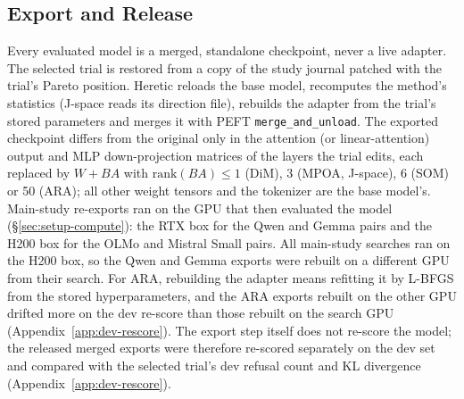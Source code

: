 \subsection{Export and Release}
\label{sec:setup-export}

Every evaluated model is a merged, standalone checkpoint, never a live adapter.
The selected trial is restored from a copy of the study journal patched with
the trial's Pareto position. Heretic reloads the base model,
recomputes the method's statistics (J-space reads its direction file), rebuilds
the adapter from the trial's stored parameters and merges it with PEFT
\texttt{merge\_and\_unload}. The exported checkpoint differs from the original
only in the attention (or linear-attention) output and MLP down-projection
matrices of the layers the trial edits, each replaced by $W+BA$ with
$\mathrm{rank}(BA)\le1$ (DiM), 3 (MPOA, J-space), 6 (SOM) or 50 (ARA); all
other weight tensors and the tokenizer are the base model's. Main-study
re-exports ran on the GPU that then evaluated the model
(\S\ref{sec:setup-compute}): the RTX box for the Qwen and Gemma pairs and the
H200 box for the OLMo and Mistral Small pairs. All main-study searches ran on
the H200 box, so the Qwen and Gemma exports were rebuilt on a different GPU
from their search. For ARA, rebuilding the adapter means refitting it by
L-BFGS from the stored hyperparameters, and the ARA exports rebuilt on the
other GPU drifted more on the dev re-score than those rebuilt on the search
GPU (Appendix~\ref{app:dev-rescore}).
The export step itself does not re-score the model; the released merged
exports were therefore re-scored separately on the dev set and compared with
the selected trial's dev refusal count and KL divergence
(Appendix~\ref{app:dev-rescore}).

